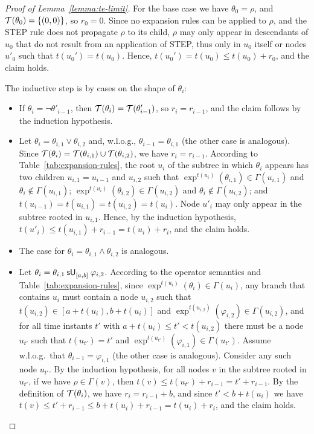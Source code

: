 \documentclass{easychair}
\begin{document}
\begin{proof}[Proof of Lemma~\ref{lemma:te-limit}]
    For the base case we have $\theta_0 = \rho$, and $\tinv(\theta_0) = \{(0,0)\}$, so $r_0 = 0$.
    Since no expansion rules can be applied to $\rho$, and the \textsf{STEP} rule does not propagate $\rho$ to its child, $\rho$ may only appear in descendants of $u_0$ that do not result from an application of \textsf{STEP}, thus only in $u_0$ itself or nodes $u'_0$ such that $t(u_0') = t(u_0)$.
    Hence, $t(u_0') = t(u_0) \leq t(u_0) + r_0$, and the claim holds.

    The inductive step is by cases on the shape of $\theta_i$:
    \begin{itemize}
        \item If $\theta_i = \neg \theta'_{i-1}$, then $\tinv(\theta_i) = \tinv(\theta'_{i-1})$, so $r_i = r_{i-1}$, and the claim follows by the induction hypothesis.
        \item Let $\theta_i = \theta_{i,1} \lor \theta_{i,2}$ and, w.l.o.g., $\theta_{i-1} = \theta_{i,1}$ (the other case is analogous).
              Since $\tinv(\theta_i) = \tinv(\theta_{i,1}) \cup \tinv(\theta_{i,2})$, we have $r_i = r_{i-1}$.
              According to Table~\ref{tab:expansion-rules}, the root $u_i$ of the subtree in which $\theta_i$ appears has two children $u_{i,1} = u_{i-1}$ and $u_{i,2}$ such that $\exp^{t(u_i)}(\theta_{i,1}) \in \Gamma(u_{i,1})$ and $\theta_i \not\in \Gamma(u_{i,1})$; $\exp^{t(u_i)}(\theta_{i,2}) \in \Gamma(u_{i,2})$ and $\theta_i \not\in \Gamma(u_{i,2})$; and $t(u_{i-1}) = t(u_{i,1}) = t(u_{i,2}) = t(u_i)$.
              Node $u'_i$ may only appear in the subtree rooted in $u_{i,1}$.
              Hence, by the induction hypothesis, $t(u'_i) \leq t(u_{i,1}) + r_{i-1} = t(u_i) + r_i$, and the claim holds.
        \item The case for $\theta_i = \theta_{i,1} \land \theta_{i,2}$ is analogous.
        \item Let $\theta_i = \suntil{[a,b]}{\theta_{i,1}}{\varphi_{i,2}}$.
              According to the operator semantics and Table~\ref{tab:expansion-rules}, since $\exp^{t(u_i)}(\theta_i) \in \Gamma(u_i)$, any branch that contains $u_i$ must contain a node $u_{i,2}$ such that $t(u_{i,2}) \in [a + t(u_i), b + t(u_i)]$ and $\exp^{t(u_{i,2})}(\varphi_{i,2}) \in \Gamma(u_{i,2})$,
              and for all time instants $t'$ with $a + t(u_i) \leq t' < t(u_{i,2})$ there must be a node $u_{t'}$ such that $t(u_{t'}) = t'$ and $\exp^{t(u_{t'})}(\varphi_{i,1}) \in \Gamma(u_{t'})$.
              Assume w.l.o.g.\ that $\theta_{i-1} = \varphi_{i,1}$ (the other case is analogous).
              Consider any such node $u_{t'}$.
              By the induction hypothesis, for all nodes $v$ in the subtree rooted in $u_{t'}$, if we have $\rho \in \Gamma(v)$, then $t(v) \leq t(u_{t'}) + r_{i-1} = t' + r_{i-1}$.
              By the definition of $\tinv(\theta_i)$, we have $r_i = r_{i-1} + b$, and since $t' < b + t(u_i)$ we have $t(v) \leq t' + r_{i-1} \leq b + t(u_i) + r_{i-1} = t(u_i) + r_i$, and the claim holds.


\end{itemize}
\end{proof}
\end{document}
